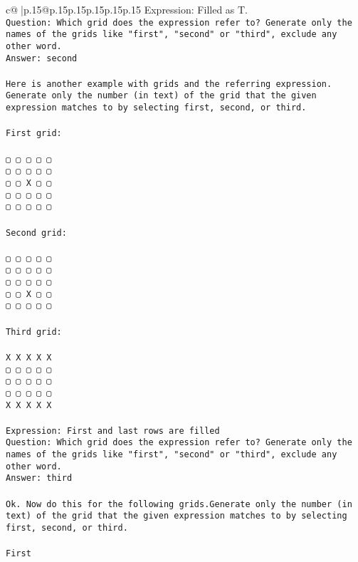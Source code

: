 \documentclass{article}
\begin{document}
{\begin{supertabular}{c@{$\;$}|p{.15\linewidth}@{}p{.15\linewidth}p{.15\linewidth}p{.15\linewidth}p{.15\linewidth}p{.15\linewidth}}
{{{Expression: Filled as T.\\ \tt Question: Which grid does the expression refer to? Generate only the names of the grids like "first", "second" or "third", exclude any other word.\\ \tt Answer: second\\ \tt \\ \tt Here is another example with grids and the referring expression. Generate only the number (in text) of the grid that the given expression matches to by selecting first, second, or third.\\ \tt \\ \tt First grid:\\ \tt \\ \tt ▢ ▢ ▢ ▢ ▢\\ \tt ▢ ▢ ▢ ▢ ▢\\ \tt ▢ ▢ X ▢ ▢\\ \tt ▢ ▢ ▢ ▢ ▢\\ \tt ▢ ▢ ▢ ▢ ▢\\ \tt \\ \tt Second grid:\\ \tt \\ \tt ▢ ▢ ▢ ▢ ▢\\ \tt ▢ ▢ ▢ ▢ ▢\\ \tt ▢ ▢ ▢ ▢ ▢\\ \tt ▢ ▢ X ▢ ▢\\ \tt ▢ ▢ ▢ ▢ ▢\\ \tt \\ \tt Third grid:\\ \tt \\ \tt X X X X X\\ \tt ▢ ▢ ▢ ▢ ▢\\ \tt ▢ ▢ ▢ ▢ ▢\\ \tt ▢ ▢ ▢ ▢ ▢\\ \tt X X X X X\\ \tt \\ \tt Expression: First and last rows are filled\\ \tt Question: Which grid does the expression refer to? Generate only the names of the grids like "first", "second" or "third", exclude any other word.\\ \tt Answer: third\\ \tt \\ \tt Ok. Now do this for the following grids.Generate only the number (in text) of the grid that the given expression matches to by selecting first, second, or third.\\ \tt \\ \tt First }}}
\end{supertabular}}
\end{document}
